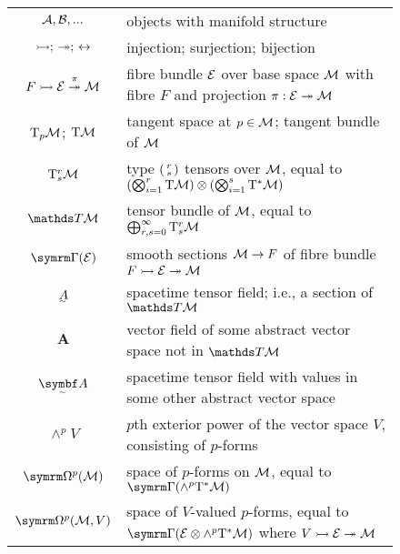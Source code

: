\begin{figure}
\begin{aside}
	\begin{tabular}{cl}
		$\cal{A, B, ...}$
	&	objects with manifold structure
	\\	$\fibrebundle{}{;\,}{};\,\leftrightarrow$
	&	injection; surjection; bijection
	\\	$\fibrebundle[\pi]{F}{\cal E}{\cal M}$
	&	fibre bundle $\cal E$ over base space $\cal M$ with fibre $F$ and projection $\pi : \cal E \twoheadrightarrow \cal M$
	\\	$\T_p\cal M$; $\T\cal M$
	&	tangent space at $p \in \cal M$; tangent bundle of $\cal M$
	\\	$\T^r_s\cal M$
	&	type $\smqty(r\\s)$ tensors over $\cal M$, equal to
		\begin{math}
			\qty(\bigotimes_{i=1}^r\T\cal M) \otimes \qty(\bigotimes_{i=1}^s\T^*\cal M)
		\end{math}
	\\[.7ex]	$\TT\cal M$
	&	tensor bundle of $\cal M$, equal to
		\begin{math}
			\bigoplus_{r,s=0}^\infty\T^r_s\cal M
		\end{math}
	\\	$\secs(\cal E)$
	&	smooth sections $\cal M \to F$ of fibre bundle $\fibrebundle{F}{\cal E}{\cal M}$
	\\	$\ts A$
	&	spacetime tensor field; i.e., a section of $\TT\cal M$
	\\	$\bm A$
	&	vector field of some abstract vector space not in $\TT\cal M$
	\\	$\tsbm A$
	&	spacetime tensor field with values in some other abstract vector space
	\\	$\wedge^pV$
	&	$p$th exterior power of the vector space $V$, consisting of $p$-forms
	\\	$\forms^p(\cal M)$
	&	space of $p$-forms on $\cal M$, equal to $\secs(\wedge^p \T^*\cal M)$
	\\	$\forms^p(\cal M, V)$
	&	space of $V$-valued $p$-forms, equal to $\secs(\cal E\otimes\wedge^p \T^*\cal M)$ where $\fibrebundle{V}{\cal E}{\cal M}$
	\end{tabular}
\end{aside}	
\end{figure}

